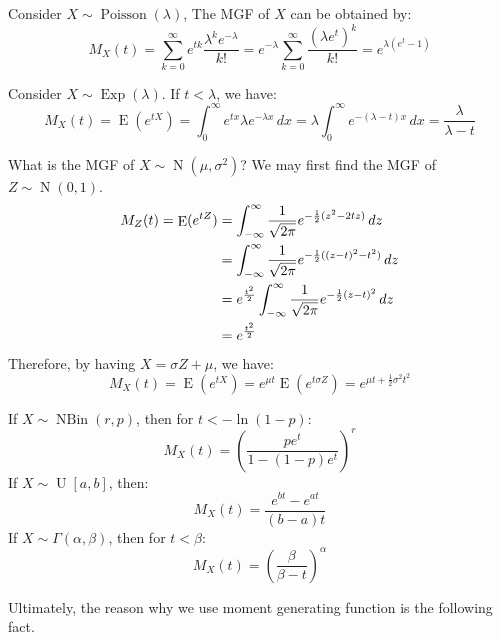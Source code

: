 \documentclass{huhtakm-template-book-v2}
\DeclareMathOperator{\E}{E}
\DeclareMathOperator{\Poisson}{Poisson}
\DeclareMathOperator{\Exp}{Exp}
\DeclareMathOperator{\N}{N}
\DeclareMathOperator{\NBin}{NBin}
\DeclareMathOperator{\U}{U}
\begin{document}
\newpage
\begin{eg}
	Consider $X\sim\Poisson(\lambda)$, The MGF of $X$ can be obtained by:
	\begin{equation*}
		M_{X}(t)=\sum_{k=0}^{\infty}e^{tk}\frac{\lambda^{k}e^{-\lambda}}{k!}=e^{-\lambda}\sum_{k=0}^{\infty}\frac{(\lambda e^{t})^{k}}{k!}=e^{\lambda(e^{t}-1)}
	\end{equation*}
\end{eg}
\begin{eg}
	Consider $X\sim\Exp(\lambda)$. If $t<\lambda$, we have:
	\begin{equation*}
		M_{X}(t)=\E(e^{tX})=\int_{0}^{\infty}e^{tx}\lambda e^{-\lambda x}\,dx=\lambda\int_{0}^{\infty}e^{-(\lambda-t)x}\,dx=\frac{\lambda}{\lambda-t}
	\end{equation*}
\end{eg}
\begin{eg}
	What is the MGF of $X\sim\N(\mu,\sigma^{2})$? We may first find the MGF of $Z\sim\N(0,1)$.
	\begin{align*}
		M_{Z}(t)=\E(e^{tZ})&=\intinfty\frac{1}{\sqrt{2\pi}}e^{-\frac{1}{2}(z^{2}-2tz)}\,dz\\
		&=\intinfty\frac{1}{\sqrt{2\pi}}e^{-\frac{1}{2}((z-t)^{2}-t^{2})}\,dz\\
		&=e^{\frac{t^{2}}{2}}\intinfty\frac{1}{\sqrt{2\pi}}e^{-\frac{1}{2}(z-t)^{2}}\,dz\\
		&=e^{\frac{t^{2}}{2}}
	\end{align*}
	Therefore, by having $X=\sigma Z+\mu$, we have:
	\begin{equation*}
		M_{X}(t)=\E(e^{tX})=e^{\mu t}\E(e^{t\sigma Z})=e^{\mu t+\frac{1}{2}\sigma^{2}t^{2}}
	\end{equation*}
\end{eg}
\begin{eg}
	If $X\sim\NBin(r,p)$, then for $t<-\ln(1-p)$:
	\begin{equation*}
		M_{X}(t)=\left(\frac{pe^{t}}{1-(1-p)e^{t}}\right)^{r}
	\end{equation*}
	If $X\sim\U[a,b]$, then:
	\begin{equation*}
		M_{X}(t)=\frac{e^{bt}-e^{at}}{(b-a)t}
	\end{equation*}
	If $X\sim\Gamma(\alpha,\beta)$, then for $t<\beta$:
	\begin{equation*}
		M_{X}(t)=\left(\frac{\beta}{\beta-t}\right)^{\alpha}
	\end{equation*}
\end{eg}
Ultimately, the reason why we use moment generating function is the following fact.
\end{document}
